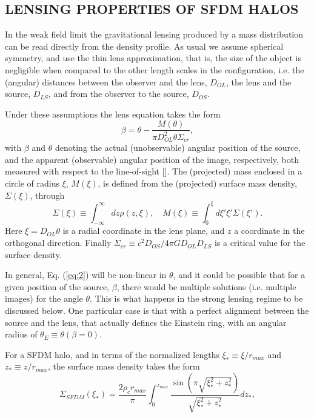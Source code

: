 \documentclass{article}
\begin{document}
\begin{multicols}{2}
\section{LENSING PROPERTIES OF SFDM HALOS}
In the weak field limit the gravitational lensing produced
by a mass distribution can be read directly from
the density profile. As usual we assume spherical symmetry,
and use the thin lens approximation, that is, the size
of the object is negligible when compared to the other
length scales in the configuration, i.e. the (angular) distances
between the observer and the lens, $D_{OL}$, the lens
and the source, $D_{LS}$, and from the observer to the source,
$D_{OS}$.\par
Under these assumptions the lens equation takes the
form
\begin{equation} \label{eq:2}
\beta=\theta-\frac{M(\theta)}{\pi D^2_{OL}\theta \Sigma_{cr}},
\end{equation}
with $\beta$ and $\theta$ denoting the actual (unobservable) angular
position of the source, and the apparent (observable) angular
position of the image, respectively, both measured
with respect to the line-of-sight [\cite{12}]. The (projected)
mass enclosed in a circle of radius $\xi$, $M(\xi)$, is defined
from the (projected) surface mass density, $\Sigma(\xi)$, through
\begin{equation} \label{eq:3}
\Sigma(\xi)\equiv \int_{-\infty}^{\infty}dz \rho(z,\xi),\quad M(\xi)\equiv \int_{0}^{\xi}d\xi ' \xi '\Sigma(\xi ').
\end{equation}
Here $\xi = D_{OL}\theta$ is a radial coordinate in the lens plane,
and $z$ a coordinate in the orthogonal direction. Finally
$\Sigma_{cr}\equiv c^2D_{OS}/4\pi GD_{OL}D_{LS}$ is a critical value for the surface
density.\par
In general, Eq. (\ref{eq:2}) will be non-linear in $\theta$, and it could
be possible that for a given position of the source, $\beta$, there
would be multiple solutions (i.e. multiple images) for
the angle $\theta$. This is what happens in the strong lensing
regime to be discussed below. One particular case is that
with a perfect alignment between the source and the lens,
that actually defines the Einstein ring, with an angular
radius of $\theta_E\equiv \theta(\beta=0)$.\par
For a SFDM halo, and in terms of the normalized
lengths $\xi_*\equiv \xi/r_{max}$ and $z_*\equiv z/r_{max}$, the surface mass
density takes the form
\begin{equation} \label{eq:4}
\Sigma_{SFDM}(\xi_*)=\frac{2\rho_cr_{max}}{\pi}\int_{0}^{z_{max}}\frac{\sin(\pi \sqrt{\xi^2_*+z^2_*})}{\sqrt{\xi^2_*+z^2_*}}dz_*,

\end{equation}
\end{multicols}
\end{document}
